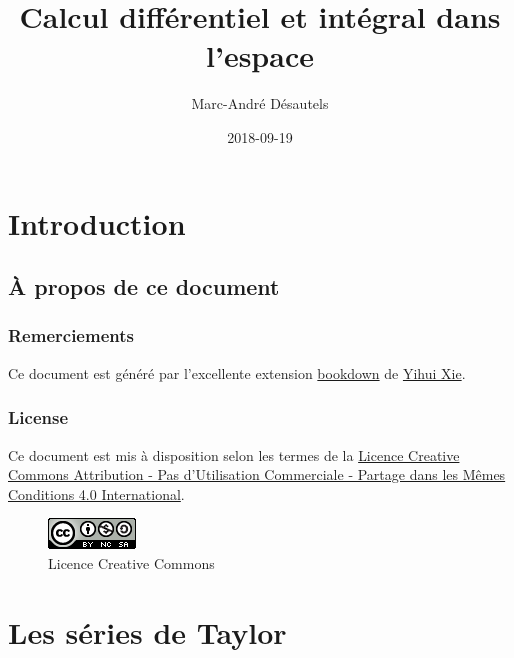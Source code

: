 \documentclass[]{book}
\title{Calcul différentiel et intégral dans l'espace}
\author{Marc-André Désautels}
\date{2018-09-19}
\theoremstyle{definition}
\theoremstyle{definition}
\theoremstyle{definition}
\theoremstyle{remark}
\begin{document}
\maketitle

{
\setcounter{tocdepth}{1}
\tableofcontents
}
\hypertarget{introduction}{%
\chapter*{Introduction}\label{introduction}}

\hypertarget{a-propos-de-ce-document}{%
\section*{À propos de ce document}\label{a-propos-de-ce-document}}

\hypertarget{remerciements}{%
\subsection*{Remerciements}\label{remerciements}}

Ce document est généré par l'excellente extension
\href{https://bookdown.org/}{bookdown} de
\href{https://yihui.name/}{Yihui Xie}.

\hypertarget{license}{%
\subsection*{License}\label{license}}

Ce document est mis à disposition selon les termes de la
\href{http://creativecommons.org/licenses/by-nc-sa/4.0/}{Licence
Creative Commons Attribution - Pas d'Utilisation Commerciale - Partage
dans les Mêmes Conditions 4.0 International}.

\begin{figure}
\centering
\includegraphics{resources/icons/license_cc.png}
\caption{Licence Creative Commons}
\end{figure}

\hypertarget{taylor}{%
\chapter{Les séries de Taylor}\label{taylor}}
\end{document}
